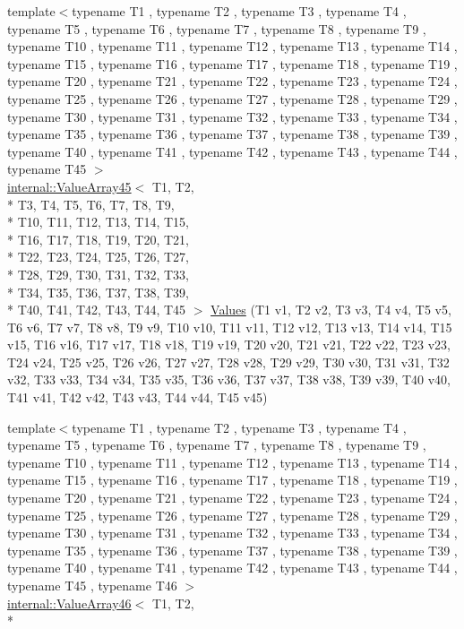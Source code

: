 \begin{DoxyCompactItemize}
\item 
{\footnotesize template$<$typename T1 , typename T2 , typename T3 , typename T4 , typename T5 , typename T6 , typename T7 , typename T8 , typename T9 , typename T10 , typename T11 , typename T12 , typename T13 , typename T14 , typename T15 , typename T16 , typename T17 , typename T18 , typename T19 , typename T20 , typename T21 , typename T22 , typename T23 , typename T24 , typename T25 , typename T26 , typename T27 , typename T28 , typename T29 , typename T30 , typename T31 , typename T32 , typename T33 , typename T34 , typename T35 , typename T36 , typename T37 , typename T38 , typename T39 , typename T40 , typename T41 , typename T42 , typename T43 , typename T44 , typename T45 $>$ }\\\hyperlink{classtesting_1_1internal_1_1_value_array45}{internal\-::\-Value\-Array45}$<$ T1, T2, \\*
T3, T4, T5, T6, T7, T8, T9, \\*
T10, T11, T12, T13, T14, T15, \\*
T16, T17, T18, T19, T20, T21, \\*
T22, T23, T24, T25, T26, T27, \\*
T28, T29, T30, T31, T32, T33, \\*
T34, T35, T36, T37, T38, T39, \\*
T40, T41, T42, T43, T44, T45 $>$ \hyperlink{namespacetesting_a227b4b3b251f5f4aa0e1261c27fe9dd4}{Values} (T1 v1, T2 v2, T3 v3, T4 v4, T5 v5, T6 v6, T7 v7, T8 v8, T9 v9, T10 v10, T11 v11, T12 v12, T13 v13, T14 v14, T15 v15, T16 v16, T17 v17, T18 v18, T19 v19, T20 v20, T21 v21, T22 v22, T23 v23, T24 v24, T25 v25, T26 v26, T27 v27, T28 v28, T29 v29, T30 v30, T31 v31, T32 v32, T33 v33, T34 v34, T35 v35, T36 v36, T37 v37, T38 v38, T39 v39, T40 v40, T41 v41, T42 v42, T43 v43, T44 v44, T45 v45)
\item 
{\footnotesize template$<$typename T1 , typename T2 , typename T3 , typename T4 , typename T5 , typename T6 , typename T7 , typename T8 , typename T9 , typename T10 , typename T11 , typename T12 , typename T13 , typename T14 , typename T15 , typename T16 , typename T17 , typename T18 , typename T19 , typename T20 , typename T21 , typename T22 , typename T23 , typename T24 , typename T25 , typename T26 , typename T27 , typename T28 , typename T29 , typename T30 , typename T31 , typename T32 , typename T33 , typename T34 , typename T35 , typename T36 , typename T37 , typename T38 , typename T39 , typename T40 , typename T41 , typename T42 , typename T43 , typename T44 , typename T45 , typename T46 $>$ }\\\hyperlink{classtesting_1_1internal_1_1_value_array46}{internal\-::\-Value\-Array46}$<$ T1, T2, \\*

\end{DoxyCompactItemize}
